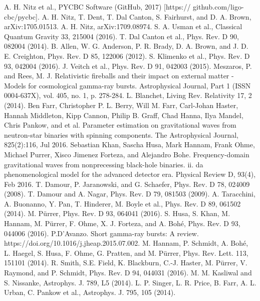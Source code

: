 \documentclass[binding=0.6cm, LaM]{sapthesis}
\begin{document}
\begin{thebibliography}{500}
	 A. H. Nitz et al., PYCBC Software (GitHub, 2017) [https:// github.com/ligo-cbc/pycbc].
	 A. H. Nitz, T. Dent, T. Dal Canton, S. Fairhurst, and D. A. Brown, arXiv:1705.01513.
	 A. H. Nitz, arXiv:1709.08974.
	 S. A. Usman et al., Classical Quantum Gravity 33, 215004 (2016).
	 T. Dal Canton et al., Phys. Rev. D 90, 082004 (2014). 
	 B. Allen, W. G. Anderson, P. R. Brady, D. A. Brown, and J. D. E. Creighton, Phys. Rev. D 85, 122006 (2012).
	 S. Klimenko et al., Phys. Rev. D 93, 042004 (2016).
	 J. Veitch et al., Phys. Rev. D 91, 042003 (2015).
	 Meszaros, P. and Rees, M. J. Relativistic fireballs and their impact on external matter - Models for cosmological gamma-ray bursts. Astrophysical Journal, Part 1 (ISSN 0004-637X), vol. 405, no. 1, p. 278-284. 
	 L. Blanchet, Living Rev. Relativity 17, 2 (2014).
	 Ben Farr, Christopher P. L. Berry, Will M. Farr, Carl-Johan Haster, Hannah Middleton, Kipp Cannon, Philip B. Graff, Chad Hanna, Ilya Mandel, Chris Pankow, and et al. Parameter estimation on gravitational waves from neutron-star binaries with spinning components. The Astrophysical Journal, 825(2):116, Jul 2016.
	Sebastian Khan, Sascha Husa, Mark Hannam, Frank Ohme, Michael Purrer, Xisco Jimenez Forteza, and Alejandro Bohe. Frequency-domain gravitational waves from nonprecessing black-hole binaries. ii. da phenomenological model for the advanced detector era. Physical Review D, 93(4), Feb 2016.  
	 T. Damour, P. Jaranowski, and G. Schaefer, Phys. Rev. D 78, 024009 (2008).
	 T. Damour and A. Nagar, Phys. Rev. D 79, 081503 (2009).
	 A. Taracchini, A. Buonanno, Y. Pan, T. Hinderer, M. Boyle et al., Phys. Rev. D 89, 061502 (2014).
	 M. Pürrer, Phys. Rev. D 93, 064041 (2016).
	 S. Husa, S. Khan, M. Hannam, M. Pürrer, F. Ohme, X. J. Forteza, and A. Bohé, Phys. Rev. D 93, 044006 (2016). 
	 P.D'Avanzo. Short gamma-ray bursts: A review. https://doi.org/10.1016/j.jheap.2015.07.002. 
	 M. Hannam, P. Schmidt, A. Bohé, L. Haegel, S. Husa, F. Ohme, G. Pratten, and M. Pürrer, Phys. Rev. Lett. 113, 151101 (2014).
	 R. Smith, S.E. Field, K. Blackburn, C.-J. Haster, M. Pürrer, V. Raymond, and P. Schmidt, Phys. Rev. D 94, 044031 (2016).
	 M. M. Kasliwal and S. Nissanke, Astrophys. J. 789, L5 (2014). 
	 L. P. Singer, L. R. Price, B. Farr, A. L. Urban, C. Pankow et al., Astrophys. J. 795, 105 (2014). 

\end{thebibliography}
\end{document}
